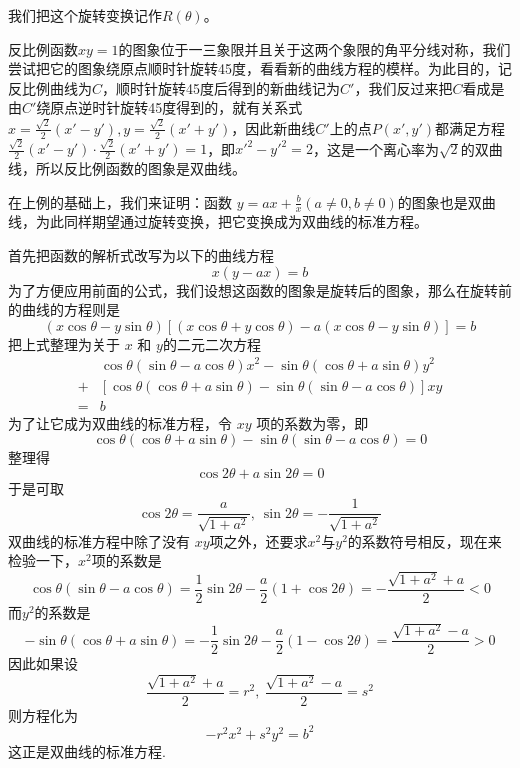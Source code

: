 我们把这个旋转变换记作$R(\theta)$。

\begin{example}
  反比例函数$xy=1$的图象位于一三象限并且关于这两个象限的角平分线对称，我们尝试把它的图象绕原点顺时针旋转45度，看看新的曲线方程的模样。为此目的，记反比例曲线为$C$，顺时针旋转45度后得到的新曲线记为$C'$，我们反过来把$C$看成是由$C'$绕原点逆时针旋转45度得到的，就有关系式$x=\frac{\sqrt{2}}{2}(x'-y'), y=\frac{\sqrt{2}}{2}(x'+y')$，因此新曲线$C'$上的点$P(x',y')$都满足方程$\frac{\sqrt{2}}{2}(x'-y') \cdot \frac{\sqrt{2}}{2}(x'+y')=1$，即$x'^2-y'^2=2$，这是一个离心率为$\sqrt{2}$的双曲线，所以反比例函数的图象是双曲线。
\end{example}

\begin{example}
  在上例的基础上，我们来证明：函数 $y=ax+\frac{b}{x}(a \neq 0, b \neq 0)$的图象也是双曲线，为此同样期望通过旋转变换，把它变换成为双曲线的标准方程。

  首先把函数的解析式改写为以下的曲线方程
  \[ x(y-ax)=b \]
  为了方便应用前面的公式，我们设想这函数的图象是旋转后的图象，那么在旋转前的曲线的方程则是
  \[ (x\cos{\theta}-y\sin{\theta})[(x\cos{\theta}+y\cos{\theta})-a(x\cos{\theta}-y\sin{\theta})]=b \]
  把上式整理为关于 $x$ 和 $y$的二元二次方程
  \begin{equation*}
    \begin{split}
      & \cos{\theta}(\sin{\theta}-a\cos{\theta})x^2 -  \sin{\theta}(\cos{\theta}+a\sin{\theta})y^2 \\
      + & [\cos{\theta}(\cos{\theta}+a\sin{\theta})-\sin{\theta}(\sin{\theta}-a\cos{\theta})]xy \\
      = & b
    \end{split}
  \end{equation*}
  为了让它成为双曲线的标准方程，令 $xy$ 项的系数为零，即
  \[ \cos{\theta}(\cos{\theta}+a\sin{\theta})-\sin{\theta}(\sin{\theta}-a\cos{\theta}) = 0 \]
  整理得
  \[ \cos{2\theta}+a\sin{2\theta}=0 \]
  于是可取
  \[ \cos{2\theta} = \frac{a}{\sqrt{1+a^2}}, \  \sin{2\theta}=-\frac{1}{\sqrt{1+a^2}} \]
  双曲线的标准方程中除了没有 $xy$项之外，还要求$x^2$与$y^2$的系数符号相反，现在来检验一下，$x^2$项的系数是
  \[ \cos{\theta}(\sin{\theta}-a\cos{\theta})=\frac{1}{2}\sin{2\theta}-\frac{a}{2}(1+\cos{2\theta}) = -\frac{\sqrt{1+a^2}+a}{2}<0 \]
  而$y^2$的系数是
  \[ -\sin{\theta}(\cos{\theta}+a\sin{\theta})=-\frac{1}{2}\sin{2\theta}-\frac{a}{2}(1-\cos{2\theta})=\frac{\sqrt{1+a^2}-a}{2}>0 \]
  因此如果设
  \[\frac{\sqrt{1+a^2}+a}{2}=r^2, \  \frac{\sqrt{1+a^2}-a}{2}=s^2 \]
  则方程化为
  \[ -r^2x^2+s^2y^2=b^2 \]
  这正是双曲线的标准方程.
\end{example}


